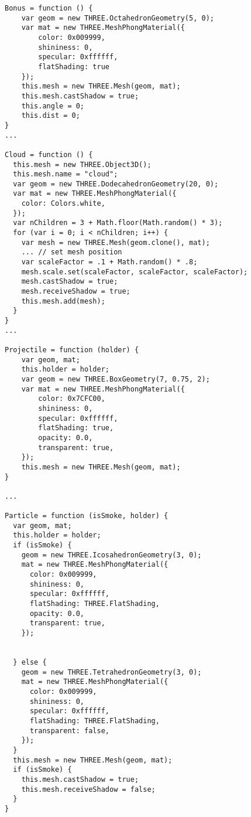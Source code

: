 \documentclass[a4paper,11pt]{article}
\begin{document}
\begin{verbatim}
Bonus = function () {
    var geom = new THREE.OctahedronGeometry(5, 0);
    var mat = new THREE.MeshPhongMaterial({
        color: 0x009999,
        shininess: 0,
        specular: 0xffffff,
        flatShading: true
    });
    this.mesh = new THREE.Mesh(geom, mat);
    this.mesh.castShadow = true;
    this.angle = 0;
    this.dist = 0;
}
...

Cloud = function () {
  this.mesh = new THREE.Object3D();
  this.mesh.name = "cloud";
  var geom = new THREE.DodecahedronGeometry(20, 0);
  var mat = new THREE.MeshPhongMaterial({
    color: Colors.white,
  });
  var nChildren = 3 + Math.floor(Math.random() * 3);
  for (var i = 0; i < nChildren; i++) {
    var mesh = new THREE.Mesh(geom.clone(), mat);
    ... // set mesh position
    var scaleFactor = .1 + Math.random() * .8;
    mesh.scale.set(scaleFactor, scaleFactor, scaleFactor);
    mesh.castShadow = true;
    mesh.receiveShadow = true;
    this.mesh.add(mesh);
  }
}
...

Projectile = function (holder) {
    var geom, mat;
    this.holder = holder;
    var geom = new THREE.BoxGeometry(7, 0.75, 2);
    var mat = new THREE.MeshPhongMaterial({
        color: 0x7CFC00,
        shininess: 0,
        specular: 0xffffff,
        flatShading: true,
        opacity: 0.0,
        transparent: true,
    });
    this.mesh = new THREE.Mesh(geom, mat);
}

...

Particle = function (isSmoke, holder) {
  var geom, mat;
  this.holder = holder;
  if (isSmoke) {
    geom = new THREE.IcosahedronGeometry(3, 0);
    mat = new THREE.MeshPhongMaterial({
      color: 0x009999,
      shininess: 0,
      specular: 0xffffff,
      flatShading: THREE.FlatShading,
      opacity: 0.0,
      transparent: true,
    });


  } else {
    geom = new THREE.TetrahedronGeometry(3, 0);
    mat = new THREE.MeshPhongMaterial({
      color: 0x009999,
      shininess: 0,
      specular: 0xffffff,
      flatShading: THREE.FlatShading,
      transparent: false,
    });
  }
  this.mesh = new THREE.Mesh(geom, mat);
  if (isSmoke) {
    this.mesh.castShadow = true;
    this.mesh.receiveShadow = false;
  }
}
\end{verbatim}
\end{document}
